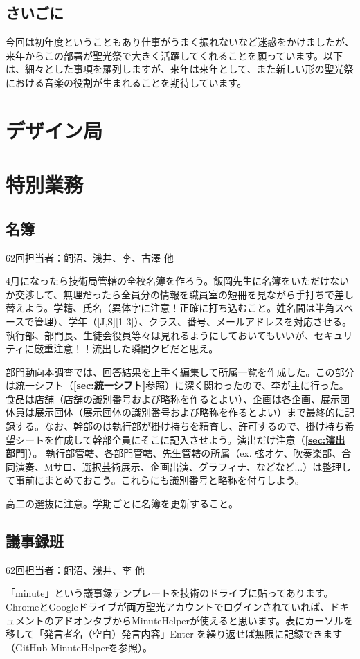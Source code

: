 \documentclass[a4paper]{ltjsreport}
\newcommand{\Chapter}[1]{\chapter{#1}\thispagestyle{fancy}}
\begin{document}
\section{さいごに}
今回は初年度ということもあり仕事がうまく振れないなど迷惑をかけましたが、来年からこの部署が聖光祭で大きく活躍してくれることを願っています。以下は、細々とした事項を羅列しますが、来年は来年として、また新しい形の聖光祭における音楽の役割が生まれることを期待しています。

\Chapter{デザイン局}
\Chapter{特別業務}
\section{名簿}\label{sec:名簿}
62回担当者：飼沼、浅井、李、古澤 他\vspace{3mm}

4月になったら技術局管轄の全校名簿を作ろう。飯岡先生に名簿をいただけないか交渉して、無理だったら全員分の情報を職員室の短冊を見ながら手打ちで差し替えよう。学籍、氏名（異体字に注意！正確に打ち込むこと。姓名間は半角スペースで管理）、学年（[J,S][1-3]）、クラス、番号、メールアドレスを対応させる。執行部、部門長、生徒会役員等々は見れるようにしておいてもいいが、セキュリティに厳重注意！！流出した瞬間クビだと思え。

部門動向本調査では、回答結果を上手く編集して所属一覧を作成した。この部分は統一シフト（{\bfseries\ref{sec:統一シフト}}参照）に深く関わったので、李が主に行った。食品は店舗（店舗の識別番号および略称を作るとよい）、企画は各企画、展示団体員は展示団体（展示団体の識別番号および略称を作るとよい）まで最終的に記録する。なお、幹部のは執行部が掛け持ちを精査し、許可するので、掛け持ち希望シートを作成して幹部全員にそこに記入させよう。演出だけ注意（{\bfseries\ref{sec:演出部門}}）。
執行部管轄、各部門管轄、先生管轄の所属（ex. 弦オケ、吹奏楽部、合同演奏、Mサロ、選択芸術展示、企画出演、グラフィナ、などなど...）は整理して事前にまとめておこう。これらにも識別番号と略称を付与しよう。

高二の選抜に注意。学期ごとに名簿を更新すること。


\section{議事録班}\label{sec:議事録班}
62回担当者：飼沼、浅井、李 他\vspace{3mm}

「minute」という議事録テンプレートを技術のドライブに貼ってあります。ChromeとGoogleドライブが両方聖光アカウントでログインされていれば、ドキュメントのアドオンタブからMinuteHelperが使えると思います。表にカーソルを移して「発言者名（空白）発言内容」Enter を繰り返せば無限に記録できます（GitHub MinuteHelperを参照）。
\end{document}
